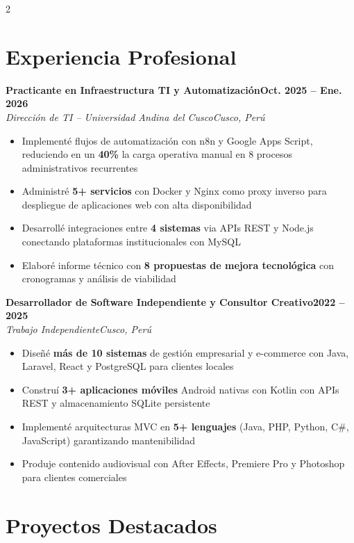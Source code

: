 \documentclass[letterpaper,10pt]{article}
\newcommand{\cventry}[4]{%
  \vspace{3pt}
  {\small\textbf{#1}\hfill\textbf{\small#2}}\\
  {\footnotesize\color{graytext}\textit{#3}\hfill\textit{#4}}
  \vspace{1pt}
}
\newcommand{\cvbullet}{\begin{itemize}[leftmargin=0.15in,itemsep=-1pt,topsep=1pt]}
\newcommand{\cvbulletend}{\end{itemize}\vspace{2pt}}
\begin{document}
\begin{paracol}{2}


\section{Experiencia Profesional}

\cventry{Practicante en Infraestructura TI y Automatizaci\'on}{Oct. 2025 -- Ene. 2026}
{Direcci\'on de TI -- Universidad Andina del Cusco}{Cusco, Per\'u}
\cvbullet
  \item[\small\textbullet] Implement\'e flujos de automatizaci\'on con n8n y Google Apps Script, reduciendo en un \textbf{40\%} la carga operativa manual en 8 procesos administrativos recurrentes
  \item[\small\textbullet] Administr\'e \textbf{5+ servicios} con Docker y Nginx como proxy inverso para despliegue de aplicaciones web con alta disponibilidad
  \item[\small\textbullet] Desarroll\'e integraciones entre \textbf{4 sistemas} via APIs REST y Node.js conectando plataformas institucionales con MySQL
  \item[\small\textbullet] Elabor\'e informe t\'ecnico con \textbf{8 propuestas de mejora tecnol\'ogica} con cronogramas y an\'alisis de viabilidad
\cvbulletend

\cventry{Desarrollador de Software Independiente y Consultor Creativo}{2022 -- 2025}
{Trabajo Independiente}{Cusco, Per\'u}
\cvbullet
  \item[\small\textbullet] Dise\~n\'e \textbf{m\'as de 10 sistemas} de gesti\'on empresarial y e-commerce con Java, Laravel, React y PostgreSQL para clientes locales
  \item[\small\textbullet] Constru\'i \textbf{3+ aplicaciones m\'oviles} Android nativas con Kotlin con APIs REST y almacenamiento SQLite persistente
  \item[\small\textbullet] Implement\'e arquitecturas MVC en \textbf{5+ lenguajes} (Java, PHP, Python, C\#, JavaScript) garantizando mantenibilidad
  \item[\small\textbullet] Produje contenido audiovisual con After Effects, Premiere Pro y Photoshop para clientes comerciales
\cvbulletend

\section{Proyectos Destacados}


\end{paracol}
\end{document}
